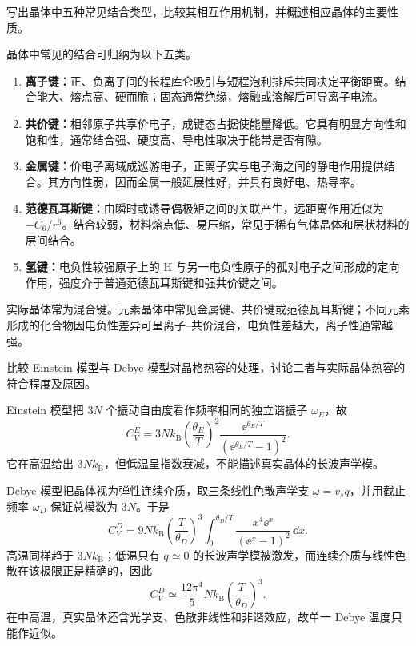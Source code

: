 \begin{question}[6 分]
写出晶体中五种常见结合类型，比较其相互作用机制，并概述相应晶体的主要性质。


\begin{solution}
晶体中常见的结合可归纳为以下五类。
\begin{enumerate}
  \item \textbf{离子键：}正、负离子间的长程库仑吸引与短程泡利排斥共同决定平衡距离。结合能大、熔点高、硬而脆；固态通常绝缘，熔融或溶解后可导离子电流。
  \item \textbf{共价键：}相邻原子共享价电子，成键态占据使能量降低。它具有明显方向性和饱和性，通常结合强、硬度高、导电性取决于能带是否有隙。
  \item \textbf{金属键：}价电子离域成巡游电子，正离子实与电子海之间的静电作用提供结合。其方向性弱，因而金属一般延展性好，并具有良好电、热导率。
  \item \textbf{范德瓦耳斯键：}由瞬时或诱导偶极矩之间的关联产生，远距离作用近似为 $-C_6/r^6$。结合较弱，材料熔点低、易压缩，常见于稀有气体晶体和层状材料的层间结合。
  \item \textbf{氢键：}电负性较强原子上的 H 与另一电负性原子的孤对电子之间形成的定向作用，强度介于普通范德瓦耳斯键和强共价键之间。
\end{enumerate}
实际晶体常为混合键。元素晶体中常见金属键、共价键或范德瓦耳斯键；不同元素形成的化合物因电负性差异可呈离子--共价混合，电负性差越大，离子性通常越强。
\end{solution}
\end{question}

\begin{question}[6 分]
比较 Einstein 模型与 Debye 模型对晶格热容的处理，讨论二者与实际晶体热容的符合程度及原因。


\begin{solution}
Einstein 模型把 $3N$ 个振动自由度看作频率相同的独立谐振子 $\omega_E$，故
\[
 C_V^{E}=3Nk_{\mathrm B}
 \left(\frac{\theta_E}{T}\right)^2
 \frac{\ee^{\theta_E/T}}{(\ee^{\theta_E/T}-1)^2}.
\]
它在高温给出 $3Nk_{\mathrm B}$，但低温呈指数衰减，不能描述真实晶体的长波声学模。

Debye 模型把晶体视为弹性连续介质，取三条线性色散声学支
$\omega=v_s q$，并用截止频率 $\omega_D$ 保证总模数为 $3N$。于是
\[
 C_V^{D}=9Nk_{\mathrm B}\left(\frac{T}{\theta_D}\right)^3
 \int_0^{\theta_D/T}
 \frac{x^4\ee^x}{(\ee^x-1)^2}\,\dd x.
\]
高温同样趋于 $3Nk_{\mathrm B}$；低温只有 $q\simeq0$ 的长波声学模被激发，而连续介质与线性色散在该极限正是精确的，因此
\[
 \boxed{C_V^{D}\simeq\frac{12\pi^4}{5}Nk_{\mathrm B}
 \left(\frac{T}{\theta_D}\right)^3.}
\]
在中高温，真实晶体还含光学支、色散非线性和非谐效应，故单一 Debye 温度只能作近似。
\end{solution}
\end{question}

